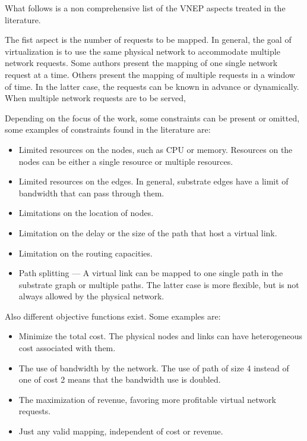 What follows is a non comprehensive list of the VNEP aspects treated in the literature.

The fist aspect is the number of requests to be mapped. In general, the goal of virtualization is to use the same physical network to accommodate multiple network requests. Some authors present the mapping of one single network request at a time. Others present the mapping of multiple requests in a window of time. In the latter case, the requests can be known in advance or dynamically. When multiple network requests are to be served, 

Depending on the focus of the work, some constraints can be present or omitted, some examples of constraints found in the literature are:

\begin{itemize}
  \item Limited resources on the nodes, such as CPU or memory. Resources on the nodes can be either a single resource or multiple resources.
  \item Limited resources on the edges. In general, substrate edges have a limit of bandwidth that can pass through them.
  \item Limitations on the location of nodes.
  \item Limitation on the delay or the size of the path that host a virtual link.
  \item Limitation on the routing capacities.
  \item Path splitting --- A virtual link can be mapped to one single path in the substrate graph or multiple paths. The latter case is more flexible, but is not always allowed by the physical network.
\end{itemize}

Also different objective functions exist. Some examples are:

\begin{itemize}
  \item Minimize the total cost. The physical nodes and links can have heterogeneous cost associated with them.
  \item The use of bandwidth by the network. The use of path of size 4 instead of one of cost 2 means that the bandwidth use is doubled.
  \item The maximization of revenue, favoring more profitable virtual network requests.
  \item Just any valid mapping, independent of cost or revenue.
\end{itemize}


